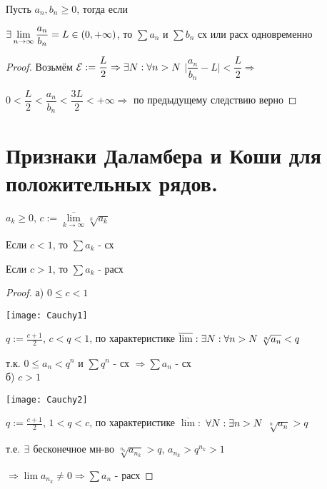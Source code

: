 \documentclass[12pt, fleqn]{article}
\begin{document}
\begin{Property}[3]
\begin{Property}[4]
\begin{Property}[2, аддитивность]
\begin{consequence} 
    Пусть $a_n, b_n \geqslant 0$, тогда если 
    
    $\exists \lim\limits_{n \rightarrow \infty} \dfrac{a_n}{b_n} = L \in (0, + \infty)$, то $\sum a_n$ и $\sum b_n$ сх или расх одновременно
\end{consequence}

\begin{proof}
    Возьмём $\mathcal{E}:=\dfrac{L}{2} \Rightarrow \exists N: \forall n > N$ $\big|\dfrac{a_n}{b_n} - L\big| < \dfrac{L}{2} \Rightarrow$
    
    $0 < \dfrac{L}{2} < \dfrac{a_n}{b_n} < \dfrac{3L}{2} < +\infty \Rightarrow$ по предыдущему следствию верно
\end{proof}

\newpage
\section{Признаки Даламбера и Коши для положительных рядов.}
 
\begin{theorem} 
    $a_k \geqslant 0$, $c:=\overline{\lim\limits_{k \rightarrow \infty}} \sqrt[k]{a_k}$
    
    Если $c < 1$, то $\sum a_k$ - сх
    
    Если $c > 1$, то $\sum a_k$ - расх
\end{theorem}

\begin{proof}
    
    а) $0 \leqslant c < 1$
    
    \texttt{[image: Cauchy1]}
    
    $q := \frac{c+1}{2}$, $c<q<1$, по характеристике $\overline{\lim}: \exists N: \forall n > N\ \sqrt[n]{a_n} < q$
    
    т.к. $0 \leqslant a_n < q^n$ и $\sum q^n$ - сх $\Rightarrow \sum a_n$ - сх
    \\
    б) $c > 1$
    
    \texttt{[image: Cauchy2]}
    
    $q := \frac{c+1}{2}$, $1<q<c$, по характеристике $\overline{\lim}:$ $\forall N: \exists n > N$ $\sqrt[n]{a_n} > q$
    
    т.е. $\exists$ бесконечное мн-во $\sqrt[n_k]{a_{n_k}} > q$, $a_{n_k} > q^{n_k} > 1$
    
    $\Rightarrow \lim a_{n_k} \neq 0 \Rightarrow \sum a_n$ - расх
\end{proof}


\end{Property}
\end{Property}
\end{Property}
\end{document}
